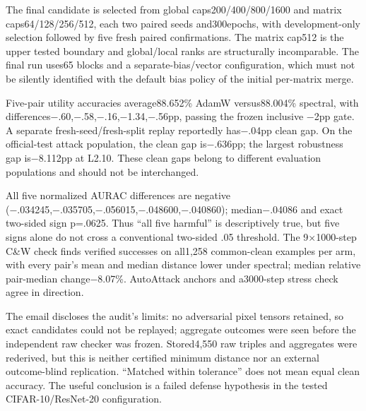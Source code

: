 \documentclass[
  british,
  10pt,
  a4paper,
]{article}
\begin{document}
The final candidate is selected from global
caps200/\allowbreak{}400/\allowbreak{}800/\allowbreak{}1600 and matrix
caps64/\allowbreak{}128/\allowbreak{}256/\allowbreak{}512,\allowbreak{}
each two paired seeds and300epochs\allowbreak{},\allowbreak{} with
development-\allowbreak{}only selection followed by five fresh paired
confirmation\allowbreak{}s.\allowbreak{} The matrix cap512 is the upper
tested boundary and global/\allowbreak{}local ranks are structurally
incomparable\allowbreak{}.\allowbreak{} The final run uses65 blocks and
a separate-\allowbreak{}bias/\allowbreak{}vector
configuratio\allowbreak{}n,\allowbreak{} which must not be silently
identified with the default bias policy of the initial per-matrix merge.

Five-pair utility accuracies average88.\allowbreak{}652\% AdamW
versus88.\allowbreak{}004\% spectral, with
differences−\allowbreak{}.\allowbreak{}60,\allowbreak{}−.\allowbreak{}58,\allowbreak{}−.\allowbreak{}16,\allowbreak{}−1.\allowbreak{}34,\allowbreak{}−.\allowbreak{}56pp,\allowbreak{}
passing the frozen inclusive −2pp gate. A separate
fresh-\allowbreak{}seed/\allowbreak{}fresh-\allowbreak{}split replay
reportedly has−.04pp clean gap. On the official-\allowbreak{}test attack
population,\allowbreak{} the clean gap is−.636pp; the largest robustness
gap is−8.112pp at L2.10. These clean gaps belong to different evaluation
populations and should not be interchanged\allowbreak{}.\allowbreak{}

All five normalized AURAC differences are negative
(−.\allowbreak{}034245,\allowbreak{}−.\allowbreak{}035705,\allowbreak{}−.\allowbreak{}056015,\allowbreak{}−.\allowbreak{}048600,\allowbreak{}−.\allowbreak{}040860);
median−.\allowbreak{}04086 and exact two-sided sign p=.0625. Thus ``all
five harmful'' is descriptively true, but five signs alone do not cross
a conventional two-sided .05 threshold. The 9×1000-\allowbreak{}step
C\&W check finds verified successes on all1,258
common-\allowbreak{}clean examples per arm, with every pair's mean and
median distance lower under spectral; median relative
pair-\allowbreak{}median change−8.\allowbreak{}07\%.\allowbreak{}
AutoAttack anchors and a3000-step stress check agree in direction.

The email discloses the audit's limits: no adversarial pixel tensors
retained, so exact candidates could not be replayed; aggregate outcomes
were seen before the independent raw checker was frozen.
Stored4,\allowbreak{}550 raw triples and aggregates were rederived, but
this is neither certified minimum distance nor an external
outcome-\allowbreak{}blind replication.\allowbreak{} ``Matched within
tolerance'' does not mean equal clean accuracy. The useful conclusion is
a failed defense hypothesis in the tested
CIFAR-\allowbreak{}10/\allowbreak{}ResNet-\allowbreak{}20
configuratio\allowbreak{}n.\allowbreak{}
\end{document}

